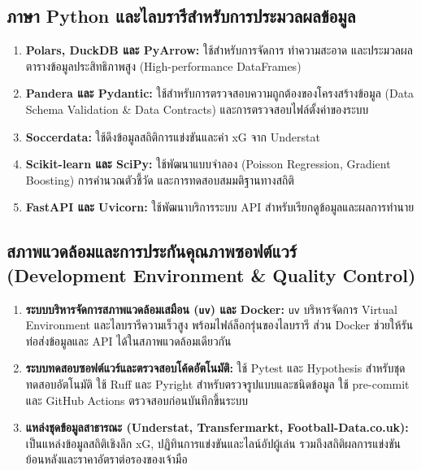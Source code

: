 \subsection{ภาษา Python และไลบรารีสำหรับการประมวลผลข้อมูล}

\begin{enumerate}[label=\arabic*)]
    \item \textbf{Polars, DuckDB และ PyArrow:} ใช้สำหรับการจัดการ ทำความสะอาด และประมวลผลตารางข้อมูลประสิทธิภาพสูง (High-performance DataFrames)
    \item \textbf{Pandera และ Pydantic:} ใช้สำหรับการตรวจสอบความถูกต้องของโครงสร้างข้อมูล (Data Schema Validation \& Data Contracts) และการตรวจสอบไฟล์ตั้งค่าของระบบ
    \item \textbf{Soccerdata:} ใช้ดึงข้อมูลสถิติการแข่งขันและค่า xG จาก Understat
    \item \textbf{Scikit-learn และ SciPy:} ใช้พัฒนาแบบจำลอง (Poisson Regression, Gradient Boosting) การคำนวณตัวชี้วัด และการทดสอบสมมติฐานทางสถิติ \cite{scikit-learn}
    \item \textbf{FastAPI และ Uvicorn:} ใช้พัฒนาบริการระบบ API สำหรับเรียกดูข้อมูลและผลการทำนาย
\end{enumerate}

\subsection{สภาพแวดล้อมและการประกันคุณภาพซอฟต์แวร์ (Development Environment \& Quality Control)}

\begin{enumerate}[label=\arabic*)]
    \item \textbf{ระบบบริหารจัดการสภาพแวดล้อมเสมือน (\texttt{uv}) และ Docker:} \texttt{uv} บริหารจัดการ Virtual Environment และไลบรารีความเร็วสูง พร้อมไฟล์ล็อกรุ่นของไลบรารี ส่วน Docker ช่วยให้รันท่อส่งข้อมูลและ API ได้ในสภาพแวดล้อมเดียวกัน
    \item \textbf{ระบบทดสอบซอฟต์แวร์และตรวจสอบโค้ดอัตโนมัติ:} ใช้ Pytest และ Hypothesis สำหรับชุดทดสอบอัตโนมัติ ใช้ Ruff และ Pyright สำหรับตรวจรูปแบบและชนิดข้อมูล ใช้ pre-commit และ GitHub Actions ตรวจสอบก่อนบันทึกขึ้นระบบ
    \item \textbf{แหล่งชุดข้อมูลสาธารณะ (Understat, Transfermarkt, Football-Data.co.uk):} เป็นแหล่งข้อมูลสถิติเชิงลึก xG, ปฏิทินการแข่งขันและไลน์อัปผู้เล่น รวมถึงสถิติผลการแข่งขันย้อนหลังและราคาอัตราต่อรองของเจ้ามือ \cite{footballdata, transfermarkt2024, understat2024}
\end{enumerate}